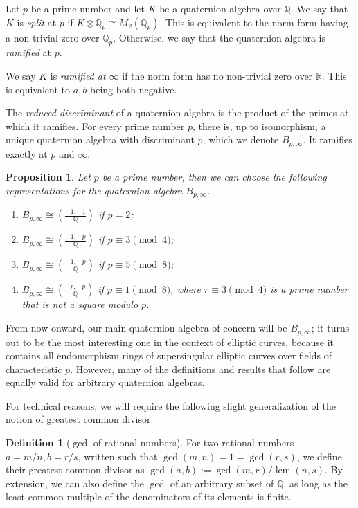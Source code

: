 \documentclass[10pt]{article}
\theoremstyle{plain}
\newtheorem{proposition}[theorem]{Proposition}
\theoremstyle{definition}
\newtheorem{definition}[theorem]{Definition}
\DeclareMathOperator{\lcm}{lcm} %
\def\Q{\ensuremath{\mathbb{Q}}}
\begin{document}
Let $p$ be a prime number and let $K$ be a quaternion algebra over $\Q$.
We say that $K$ is \emph{split} at $p$ if $K\otimes\Q_p\cong M_2(\Q_p)$.
This is equivalent to the norm form having a non-trivial zero over $\Q_p$.
Otherwise, we say that the quaternion algebra is \emph{ramified} at $p$.

We say $K$ is \emph{ramified at $\infty$}
if the norm form has no non-trivial zero over $\mathbb{R}$.
This is equivalent to $a,b$ being both negative.

The \emph{reduced discriminant} of a quaternion algebra
is the product of the primes at which it ramifies.
For every prime number $p$, there is, up to isomorphism,
a unique quaternion algebra with discriminant $p$, which we denote
$B_{p,\infty}$. It ramifies exactly at $p$ and $\infty$.

\begin{proposition}
Let $p$ be a prime number, then we can choose the following representations
for the quaternion algebra $B_{p,\infty}$.
\begin{enumerate}
\item $B_{p,\infty} \cong \left(\frac{-1,-1}{\Q}\right)$
if $p=2$;
\item $B_{p,\infty} \cong \left(\frac{-1,-p}{\Q}\right)$
if $p\equiv 3\pmod{4}$;
\item $B_{p,\infty} \cong \left(\frac{-1,-p}{\Q}\right)$
if $p\equiv 5\pmod{8}$;
\item $B_{p,\infty} \cong \left(\frac{-r,-p}{\Q}\right)$
if $p\equiv 1\pmod{8}$, where $r\equiv 3\pmod{4}$ is a prime number
that is not a square modulo $p$.
\end{enumerate}
\end{proposition}

From now onward, our main quaternion algebra of concern will be $B_{p,\infty}$;
it turns out to be the most interesting one in the context of elliptic curves,
because it contains all endomorphism rings of supersingular elliptic curves
over fields of characteristic $p$. However, many of the definitions and results
that follow are equally valid for arbitrary quaternion algebras.

For technical reasons,
we will require the following slight generalization of the notion of
greatest common divisor.
\begin{definition}[$\gcd$ of rational numbers]
For two rational numbers $a=m/n,b=r/s$,
written such that $\gcd(m,n)=1=\gcd(r,s)$,
we define their greatest common divisor as
$\gcd(a,b) := \gcd(m,r)/\lcm(n,s)$.
By extension, we can also define
the $\gcd$ of an arbitrary subset of $\Q$,
as long as the least common multiple of the denominators of its
elements is finite.
\end{definition}
\end{document}
